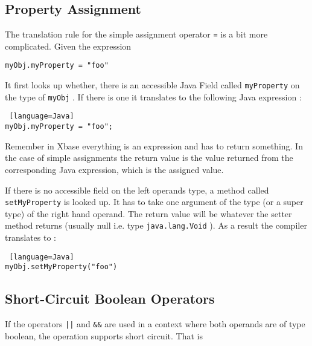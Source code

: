 \documentclass[a4paper,10pt]{scrreprt}
\begin{document}
\subsection{Property Assignment}
\label{propertyAssignment}
The translation rule for the simple assignment operator \lstinline{=}
 is a bit more complicated.
Given the expression 

\begin{lstlisting}
myObj.myProperty = "foo"

\end{lstlisting}


It first looks up whether, there is an accessible Java Field called \lstinline{myProperty}
 on the type of \lstinline{myObj}
. If there is one it translates to
the following Java expression :

\begin{lstlisting} [language=Java]
myObj.myProperty = "foo";

\end{lstlisting}


Remember in Xbase everything is an expression and has to return something. In the case of simple assignments the return value is the value returned from the corresponding
Java expression, which is the assigned value.

If there is no accessible field on the left operands type, a method called \lstinline{setMyProperty}
 is looked up. It has to take one argument of the type (or a super type) of the right hand operand.
The return value will be whatever the setter method returns (usually null i.e. type \lstinline{java.lang.Void}
). 
As a result the compiler translates to :

\begin{lstlisting} [language=Java]
myObj.setMyProperty("foo")

\end{lstlisting}





\subsection{Short-Circuit Boolean Operators}

If the operators \lstinline{||}
 and \lstinline{&&}
 are used in a context where both operands are of type boolean, the operation supports short circuit.
That is 
\end{document}
